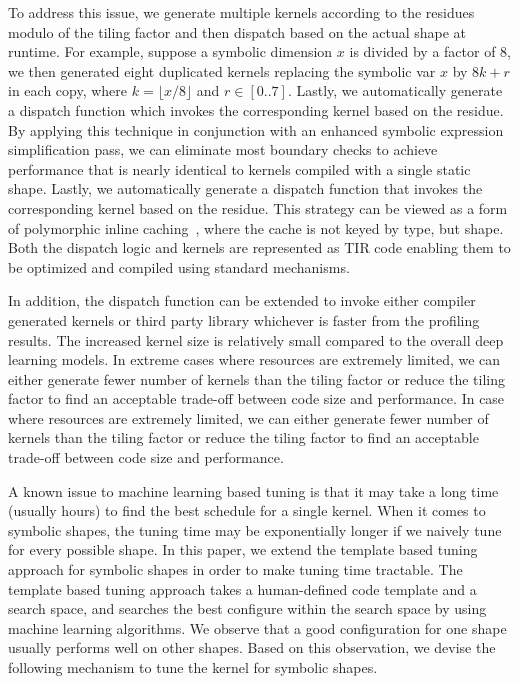 To address this issue, we generate multiple kernels according to the residues modulo of the tiling
  factor and then dispatch based on the actual shape at runtime.
For example, suppose a symbolic dimension $x$ is divided by a factor of 8, we then
  generated eight duplicated kernels replacing the symbolic var $x$ by $8k+r$ in each copy,
  where $k = \lfloor x / 8 \rfloor$ and $r \in [0..7]$.
Lastly, we automatically generate a dispatch function which invokes
  the corresponding kernel based on the residue.
By applying this technique in conjunction with an enhanced symbolic expression simplification pass,
  we can eliminate most boundary checks to achieve performance that is nearly identical
  to kernels compiled with a single static shape.
Lastly, we automatically generate a dispatch function that invokes the
  corresponding kernel based on the residue.
This strategy can be viewed as a form of polymorphic inline caching~\citep{inline_caches},
  where the cache is not keyed by type, but shape.
Both the dispatch logic and kernels are represented as TIR code enabling them
  to be optimized and compiled using standard mechanisms.

In addition, the dispatch function can be extended to invoke either compiler generated kernels
  or third party library whichever is faster from the profiling results.
The increased kernel size is relatively small compared to the overall deep learning models.
In extreme cases where resources are extremely limited,
  we can either generate fewer number of kernels than the tiling factor
  or reduce the tiling factor to find an acceptable trade-off
  between code size and performance.
In case where resources are extremely limited, we can either generate fewer number of kernels
  than the tiling factor or reduce the tiling factor to find an acceptable
  trade-off between code size and performance.

A known issue to machine learning based tuning is that it may take a long time (usually hours) to find
  the best schedule for a single kernel.
When it comes to symbolic shapes, the tuning time may be exponentially longer if we
  naively tune for every possible shape.
In this paper, we extend the template based tuning approach for
  symbolic shapes in order to make tuning time tractable.
The template based tuning approach takes a human-defined
  code template and a search space, and searches the best configure
  within the search space by using machine learning algorithms.
We observe that a good configuration for one shape usually performs
  well on other shapes.
Based on this observation, we devise the following mechanism
  to tune the kernel for symbolic shapes.

